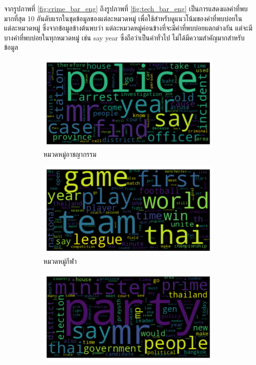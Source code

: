 \documentclass[12pt,oneside,openright,a4paper]{cpe-thai-project}
\begin{document}
\begin{itemize}
        \hspace{1cm}จากรูปภาพที่ \ref{fig:crime_bar_eng} ถึงรูปภาพที่ \ref{fig:tech_bar_eng} เป็นการแสดงผลคำที่พบมากที่สุด 10 อันดับแรกในชุดข้อมูลของแต่ละหมวดหมู่
        เพื่อใช้สำหรับดูแนวโน้มของคำที่พบบ่อยในแต่ละหมวดหมู่ ซึ่งจากข้อมูลข้างต้นพบว่า แต่ละหมวดหมู่ค่อนข้างที่จะมีคำที่พบบ่อยแตกต่างกัน แต่จะมีบางคำที่พบบ่อยในทุกหมวดหมู่
        เช่น say year ซึ่งถือว่าเป็นคำทั่วไป ไม่ได้มีความสำคัญมากสำหรับข้อมูล 
        \newpage
        \begin{figure}[!ht]\centering
          \begin{subfigure}{0.49\textwidth}
            \includegraphics[width=\linewidth]{./img/eng_stat/crime_wc.png} 
            \caption{หมวดหมู่อาชญากรรม}
            \label{fig:subim_eng1}
          \end{subfigure}
          \begin{subfigure}{0.49\textwidth}
            \includegraphics[width=\linewidth]{./img/eng_stat/sport_wc.png}
            \caption{หมวดหมู่กีฬา}
            \label{fig:subim_eng2}
          \end{subfigure}
          \begin{subfigure}{0.49\textwidth}
            \includegraphics[width=\linewidth]{./img/eng_stat/polit_wc.png}

\end{subfigure}
\end{figure}
\end{itemize}
\end{document}
